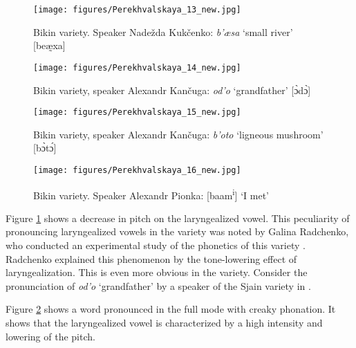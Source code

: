 \documentclass[output=paper,colorlinks,citecolor=brown]{langscibook}
\begin{document}

\begin{figure}[p]
\texttt{[image: figures/Perekhvalskaya\_13\_new.jpg]}
\caption{Bikin variety. Speaker Nadežda Kukčenko: \textit{b’æsa} ‘small river’ [beæ{̰}xa]}
\label{fig:7:13}
\end{figure}

\begin{figure}[p]
\texttt{[image: figures/Perekhvalskaya\_14\_new.jpg]}
\caption{Bikin variety, speaker Alexandr Kančuga: \textit{od’o} ‘grandfather’ [ɔ̀dɔ̀]}
\label{fig:7:14}
\end{figure}

\begin{figure}[p]
\texttt{[image: figures/Perekhvalskaya\_15\_new.jpg]}
\caption{Bikin variety, speaker Alexandr Kančuga: \textit{b’oto} ‘ligneous mushroom’ [bɔ̀tɔ́]}
\label{fig:7:15}
\end{figure}

\begin{figure}[p]
\texttt{[image: figures/Perekhvalskaya\_16\_new.jpg]}
\caption{Bikin variety. Speaker Alexandr Pionka: [baam\textsuperscript{i}] ‘I met’}
\label{fig:7:16}
\end{figure}

Figure \ref{fig:7:13} shows a decrease in pitch on the laryngealized vowel. This peculiarity of pronouncing laryngealized vowels in the  variety was noted by Galina Radchenko, who conducted an experimental study of the phonetics of this variety \citep[37]{Radchenko1988}. Radchenko explained this phenomenon by the tone-lowering effect of laryngealization. This is even more obvious in the  variety. Consider the pronunciation of \textit{od’o} ‘grandfather’ by a speaker of the Sjain variety in .



Figure \ref{fig:7:14} shows a word pronounced in the full mode with creaky phonation. It shows that the laryngealized vowel is characterized by a high intensity and lowering of the pitch.
\end{document}
